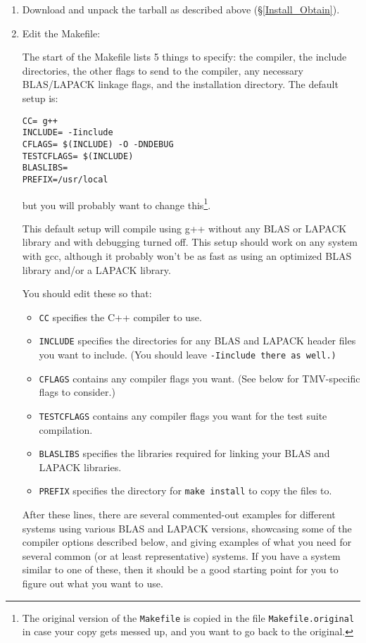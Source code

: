 \begin{enumerate}
\item Download and unpack the tarball as described above (\S\ref{Install_Obtain}).

\item
Edit the Makefile:

The start of the Makefile lists 5 things to specify: the compiler,
the include directories, the other flags to send to the compiler, 
any necessary BLAS/LAPACK linkage flags, and the installation directory.
The default setup is:
\begin{verbatim}
CC= g++
INCLUDE= -Iinclude
CFLAGS= $(INCLUDE) -O -DNDEBUG
TESTCFLAGS= $(INCLUDE)
BLASLIBS=
PREFIX=/usr/local
\end{verbatim}
but you will probably want to change this\footnote{
The original version of the \texttt{Makefile}
is copied in the file \texttt{Makefile.original} in case your copy gets messed up, and you want to 
go back to the original.}.

This default setup will compile using g++ without any BLAS or LAPACK library and 
with debugging turned off. 
This setup should work on any system with gcc, although it probably
won't be as fast as using an optimized BLAS library and/or a LAPACK library.

You should edit these so that:
\begin{itemize}
\item \texttt{CC} specifies the C++ compiler to use.
\item \texttt{INCLUDE} specifies the directories for any BLAS and LAPACK header
files you want to include. (You should leave \tt{-Iinclude} there as well.)
\item \texttt{CFLAGS} contains any compiler flags you want.
(See below for TMV-specific flags to consider.)
\item \texttt{TESTCFLAGS} contains any compiler flags you want for the test suite compilation.
\item \texttt{BLASLIBS} specifies the libraries required for linking your BLAS and LAPACK libraries.
\item \texttt{PREFIX} specifies the directory for \texttt{make install} to copy the files to.
\end{itemize}

After these lines, there are several commented-out examples for different systems 
using various BLAS
and LAPACK versions, showcasing some of the compiler options described below,
and giving examples of what you need for several common (or at least representative) systems.
If you have a system similar to one of these, then it should be a good 
starting point for you to figure out what you want to use.


\end{enumerate}
